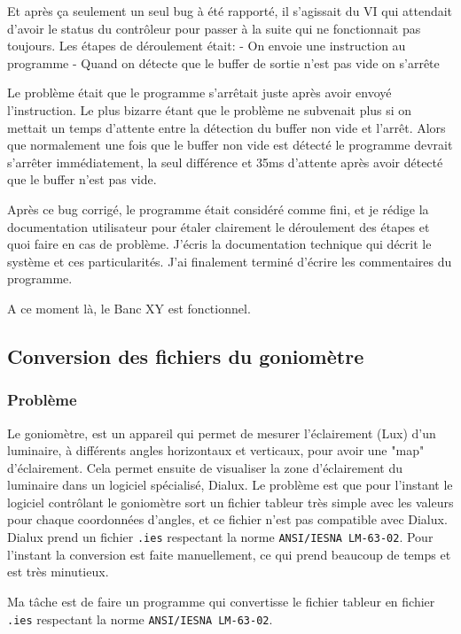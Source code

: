 \documentclass[a4paper, 12pt]{article}
\begin{document}
Et après ça seulement un seul bug à été rapporté, il s'agissait du VI qui attendait d'avoir le status du contrôleur pour passer à la suite qui ne fonctionnait pas toujours.
Les étapes de déroulement était:
- On envoie une instruction au programme
- Quand on détecte que le buffer de sortie n'est pas vide on s'arrête

Le problème était que le programme s'arrêtait juste après avoir envoyé l'instruction.
Le plus bizarre étant que le problème ne subvenait plus si on mettait un temps d'attente entre la détection du buffer non vide et l'arrêt.
Alors que normalement une fois que le buffer non vide est détecté le programme devrait s'arrêter immédiatement, la seul différence et 35ms d'attente après avoir détecté que le buffer n'est pas vide.

Après ce bug corrigé, le programme était considéré comme fini, et je rédige la documentation utilisateur pour étaler clairement le déroulement des étapes et quoi faire en cas de problème.
J'écris la documentation technique qui décrit le système et ces particularités.
J'ai finalement terminé d'écrire les commentaires du programme.

A ce moment là, le Banc XY est fonctionnel.

\subsection{Conversion des fichiers du goniomètre } 

\subsubsection{Problème}

Le goniomètre, est un appareil qui permet de mesurer l'éclairement (Lux) d'un luminaire, à différents angles horizontaux et verticaux, pour avoir une "map" d'éclairement.  
Cela permet ensuite de visualiser la zone d'éclairement du luminaire dans un logiciel spécialisé, Dialux.  
Le problème est que pour l'instant le logiciel contrôlant le goniomètre sort un fichier tableur très simple avec les valeurs pour chaque coordonnées d'angles, et ce fichier n'est pas compatible avec Dialux.  
Dialux prend un fichier \verb|.ies| respectant la norme \verb|ANSI/IESNA LM-63-02|.  
Pour l'instant la conversion est faite manuellement, ce qui prend beaucoup de temps et est très minutieux.  

Ma tâche est de faire un programme qui convertisse le fichier tableur en fichier \verb|.ies| respectant la norme \verb|ANSI/IESNA LM-63-02|.  
\end{document}
